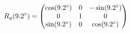 \documentclass[preview]{standalone}
\begin{document}
\begin{align*}
\special{dvisvgm:raw <g id='unique000'>}R_y(9.2^\circ) = \begin{pmatrix} \cos(9.2^\circ) & 0 & -\sin(9.2^\circ) \\ 0 & 1 & 0 \\ \sin(9.2^\circ) & 0 & \cos(9.2^\circ) \end{pmatrix}\special{dvisvgm:raw </g>}
\end{align*}
\end{document}
